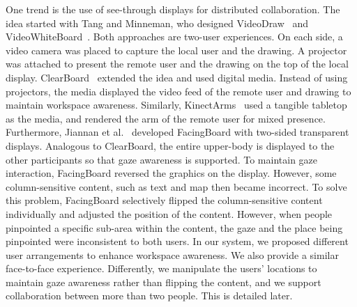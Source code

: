 \documentclass{sigchi}
\begin{document}
One trend is the use of see-through displays for distributed collaboration. The idea started with Tang and Minneman, who designed VideoDraw~\cite{tang1990videodraw} and VideoWhiteBoard~\cite{tang1991videowhiteboard}. Both approaches are two-user experiences. On each side, a video camera was placed to capture the local user and the drawing. A projector was attached to present the remote user and the drawing on the top of the local display. ClearBoard~\cite{ishii1992clearboard} extended the idea and used digital media. Instead of using projectors, the media displayed the video feed of the remote user and drawing to maintain workspace awareness. Similarly, KinectArms~\cite{genest2013kinectarms} used a tangible tabletop as the media, and rendered the arm of the remote user for mixed presence. Furthermore, Jiannan et al.~\cite{li2014interactive} developed FacingBoard with two-sided transparent displays. Analogous to ClearBoard, the entire upper-body is displayed to the other participants so that gaze awareness is supported. To maintain gaze interaction, FacingBoard reversed the graphics on the display. However, some column-sensitive content, such as text and map then became incorrect. To solve this problem, FacingBoard selectively flipped the column-sensitive content individually and adjusted the position of the content. However, when people pinpointed a specific sub-area within the content, the gaze and the place being pinpointed were inconsistent to both users. In our system, we proposed different user arrangements to enhance workspace awareness. We also provide a similar face-to-face experience. Differently, we manipulate the users' locations to maintain gaze awareness rather than flipping the content, and we support collaboration between more than two people. This is detailed later.
\end{document}
